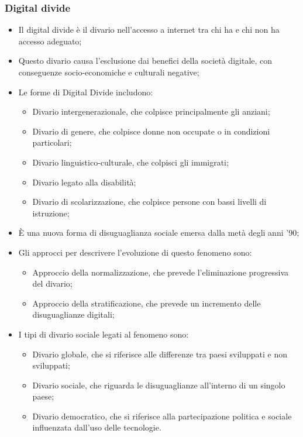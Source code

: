 \documentclass{article}
\begin{document}
\subsubsection{Digital divide}
\begin{itemize}
    \item Il digital divide è il divario nell'accesso a internet tra chi ha e chi non ha
        accesso adeguato;
    \item Questo divario causa l'esclusione dai benefici della società digitale, con
        conseguenze socio-economiche e culturali negative;
    \item Le forme di Digital Divide includono:
        \begin{itemize}
            \item Divario intergenerazionale, che colpisce principalmente gli anziani;
            \item Divario di genere, che colpisce donne non occupate o in condizioni particolari;
            \item Divario linguistico-culturale, che colpisci gli immigrati;
            \item Divario legato alla disabilità;
            \item Divario di scolarizzazione, che colpisce persone con bassi livelli di istruzione;
        \end{itemize}
    \item È una nuova forma di disuguaglianza sociale emersa dalla metà degli anni '90;
    \item Gli approcci per descrivere l'evoluzione di questo fenomeno sono:
        \begin{itemize}
            \item Approccio della normalizzazione, che prevede l'eliminazione progressiva del
                divario;
            \item Approccio della stratificazione, che prevede un incremento delle
                disuguaglianze digitali;
        \end{itemize}
    \item I tipi di divario sociale legati al fenomeno sono:
        \begin{itemize}
            \item Divario globale, che si riferisce alle differenze tra paesi sviluppati e
                non sviluppati;
            \item Divario sociale, che riguarda le disuguaglianze all'interno di un singolo
                paese;
            \item Divario democratico, che si riferisce alla partecipazione politica e sociale
                influenzata dall'uso delle tecnologie.
        \end{itemize}
\end{itemize}
\end{document}
